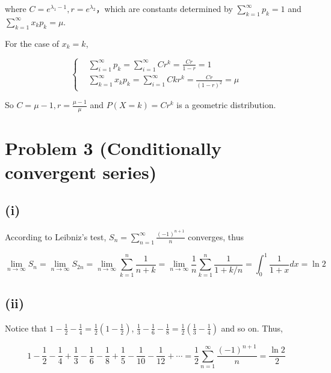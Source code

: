 \documentclass{article}
\begin{document}
where $C = e^{\lambda_1 -1},r = e^{\lambda_2}$，which are constants determined by $\sum_{k=1}^{\infty} p_k =1$ and $\sum_{k=1}^{\infty} x_kp_k =\mu$.

For the case of $x_k = k$,

\begin{equation}
    \left\{
        \begin{aligned}
            &\sum_{i=1}^{\infty} p_k = \sum_{i=1}^{\infty} Cr^k = \frac {Cr}{1-r} = 1 \\
            &\sum_{k=1}^{\infty} x_kp_k = \sum_{i=1}^{\infty} C kr^k= \frac {Cr}{(1-r)^2} = \mu 
        \end{aligned}
    \right.
\end{equation}

So $C =\mu-1, r = \frac{\mu-1}{\mu}$ and $P(X=k) = Cr^k$ is a geometric distribution.

\section{Problem 3 (Conditionally convergent series)}

\subsection{(i)}

According to Leibniz's test, $S_n = \sum_{n=1}^{\infty} \frac{(-1)^{n+1}}{n}
$ converges, thus

\begin{equation}
    \lim_{n\to\infty} S_n = \lim_{n\to \infty} S_{2n} = \lim_{n\to \infty} \sum_{k= 1}^n \frac {1}{n+k} = \lim_{n\to \infty} \frac{1}{n}\sum_{k= 1}^n \frac {1}{1+k/n} = \int_{0}^1 \frac {1}{1+x}dx = \ln 2
\end{equation}

\subsection{(ii)}

Notice that $1-\frac{1}{2}-\frac{1}{4} = \frac{1}{2} (1-\frac{1}{2})$, $\frac{1}{3}-\frac{1}{6}-\frac{1}{8} = \frac{1}{2} (\frac{1}{3}-\frac{1}{4})$ and so on. Thus,

\begin{equation}
    1-\frac{1}{2}-\frac{1}{4}+\frac{1}{3}-\frac{1}{6}-\frac{1}{8}+\frac{1}{5}-\frac{1}{10}-\frac{1}{12}+\cdots = \frac {1}{2} \sum_{n=1}^{\infty} \frac{(-1)^{n+1}}{n} = \frac {\ln 2} {2}
\end{equation}
\end{document}

